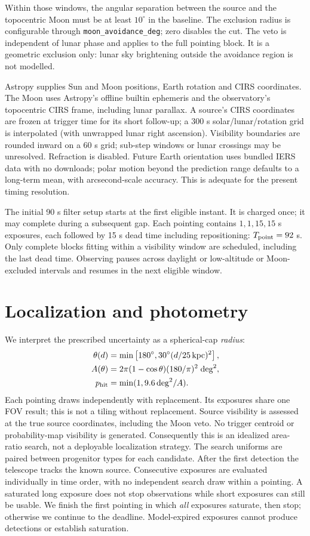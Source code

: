 \documentclass[11pt]{article}
\begin{document}
Within those windows, the angular separation between the source and the
topocentric Moon must be at least $10^\circ$ in the baseline. The exclusion
radius is configurable through \texttt{moon\_avoidance\_deg}; zero disables
the cut. The veto is independent of lunar phase and applies to the full
pointing block. It is a geometric exclusion only: lunar sky brightening
outside the avoidance region is not modelled.

Astropy supplies Sun and Moon positions, Earth rotation and CIRS coordinates.
The Moon uses Astropy's offline builtin ephemeris and the observatory's
topocentric CIRS frame, including lunar parallax. A source's
CIRS coordinates are frozen at trigger time for its short follow-up; a 300 s
solar/lunar/rotation grid is interpolated (with unwrapped lunar right ascension).
Visibility boundaries are rounded inward on a 60 s grid; sub-step windows or
lunar crossings may be unresolved. Refraction is disabled.
Future Earth orientation uses bundled IERS data with no downloads; polar motion
beyond the prediction range defaults to a long-term mean, with arcsecond-scale
accuracy. This is adequate for the present timing resolution.

The initial 90 s filter setup starts at the first eligible instant. It is charged
once; it may complete during a subsequent gap. Each pointing contains
$1,1,15,15$ s exposures, each followed by 15 s dead time including repositioning:
$T_{\rm point}=92$ s. Only complete blocks fitting within a visibility window are
scheduled, including the last dead time. Observing pauses across daylight or
low-altitude or Moon-excluded intervals and resumes in the next eligible window.

\section{Localization and photometry}
We interpret the prescribed uncertainty as a spherical-cap \emph{radius}:
\begin{align}
\theta(d)&=\min\left[180^\circ,30^\circ(d/25\,{\rm kpc})^2\right],\\
A(\theta)&=2\pi(1-\cos\theta)(180/\pi)^2\;{\rm deg}^2,\\
p_{\rm hit}&=\min(1,9.6\,{\rm deg}^2/A).
\end{align}
Each pointing draws independently with replacement. Its exposures share one
FOV result; this is not a tiling without replacement. Source visibility is
assessed at the true source coordinates, including the Moon veto. No trigger
centroid or probability-map visibility is generated. Consequently this is an idealized area-ratio search,
not a deployable localization strategy. The search uniforms are paired between
progenitor types for each candidate. After the first detection the telescope
tracks the known source. Consecutive exposures are evaluated individually in
time order, with no independent search draw within a pointing. A saturated
long exposure does not stop observations while short exposures can still be
usable. We finish the first pointing in which \emph{all} exposures saturate,
then stop; otherwise we continue to the deadline. Model-expired exposures
cannot produce detections or establish saturation.
\end{document}
